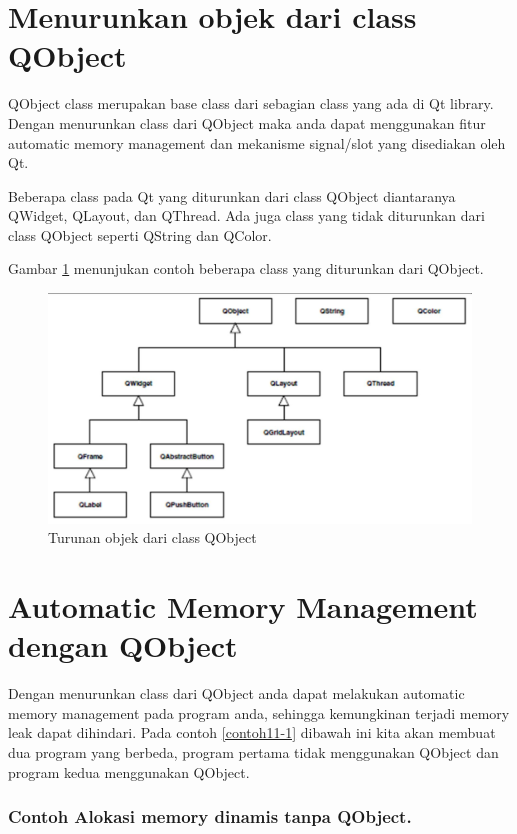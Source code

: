 \section{Menurunkan objek dari class QObject}\label{menurunkan-objek-dari-class-qobject}

QObject class merupakan base class dari sebagian class yang ada di Qt
library. Dengan menurunkan class dari QObject maka anda dapat
menggunakan fitur automatic memory management dan mekanisme signal/slot
yang disediakan oleh Qt.

Beberapa class pada Qt yang diturunkan dari class QObject diantaranya
QWidget, QLayout, dan QThread.
Ada juga class yang tidak diturunkan dari
class QObject seperti QString dan QColor.

Gambar \ref{fig:qobjek} menunjukan contoh beberapa class yang diturunkan dari
QObject.

\begin{figure}
\centering
\includegraphics[width=0.9\linewidth]{../manuscript/images/Qobjek}
\caption{Turunan objek dari class QObject}
\label{fig:qobjek}
\end{figure}


\section{Automatic Memory Management dengan QObject}\label{automatic-memory-management-dengan-qobject}

Dengan menurunkan class dari QObject anda dapat melakukan automatic
memory management pada program anda, sehingga kemungkinan terjadi memory
leak dapat dihindari. Pada contoh \ref{contoh11-1} dibawah ini kita akan membuat dua
program yang berbeda, program pertama tidak menggunakan QObject dan
program kedua menggunakan QObject.

\subsubsection*{Contoh  Alokasi memory dinamis tanpa QObject.}

